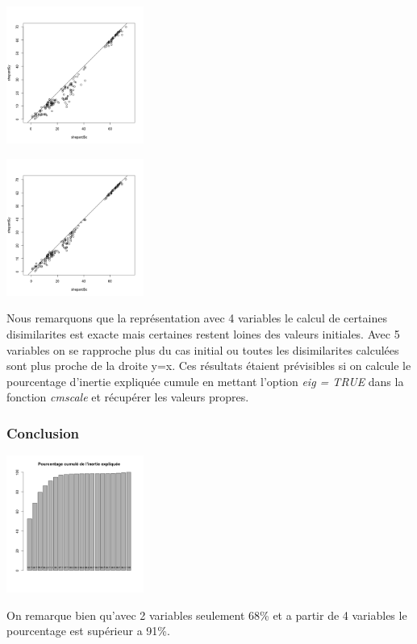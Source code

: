 \documentclass[10pt]{article}
\begin{document}
		\begin{minipage}{.5\textwidth}
		\includegraphics[width=45mm]{Figures/Mutations2_1/shepard4.png}
		\label{fig:shepard4}
	\end{minipage}%
	\hspace{0.02\linewidth}
	\begin{minipage}{.5\textwidth}
		\includegraphics[width=45mm]{Figures/Mutations2_1/shepard5.png}
		\label{fig:shepard5}
	\end{minipage}
	\vspace{0.1mm}

	Nous remarquons que la représentation avec 4 variables le calcul de certaines disimilarites est exacte mais certaines restent loines des valeurs initiales. Avec 5 variables on se rapproche plus du cas initial ou toutes les disimilarites calculées sont plus proche de la droite y=x. Ces résultats étaient prévisibles si on calcule le pourcentage d'inertie expliquée cumule en mettant l'option \textit{eig = TRUE} dans la fonction \textit{cmscale} et récupérer les valeurs propres.
	
	\subsubsection{Conclusion}
	\begin{center}
		\includegraphics[width=45mm]{Figures/Mutations2_1/barplot.png}
		\label{fig:mutations_barplot}
		\end{center}
	On remarque bien qu'avec 2 variables seulement 68\%  et a partir de 4 variables le pourcentage est supérieur a 91\%.
\end{document}
